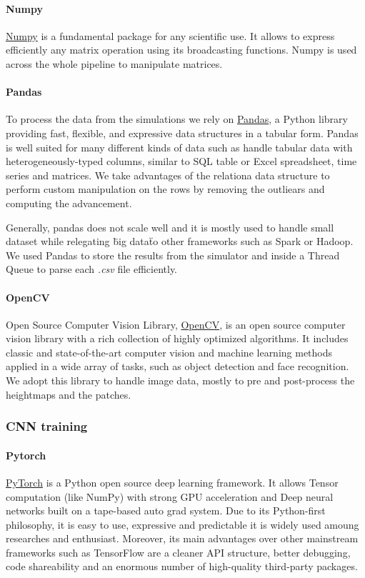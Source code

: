 \documentclass[../document.tex]{subfiles}
\begin{document}
\paragraph{Numpy}\href{https://www.numpy.org/}{Numpy} is a fundamental package for any scientific use. It allows to express efficiently any matrix operation using its broadcasting functions. Numpy is used across the whole pipeline to manipulate matrices.
\paragraph{Pandas}To process the data from the simulations we rely on \href{https://pandas.pydata.org/}{Pandas}, a Python library providing fast, flexible, and expressive data structures in a tabular form. Pandas is well suited for many different kinds of data such as handle tabular data with heterogeneously-typed columns, similar to SQL table or Excel spreadsheet, time series and matrices. We take advantages of the relationa data structure to perform custom manipulation on the rows by removing the outliears and computing the advancement.

Generally, pandas does not scale well and it is mostly used to handle small dataset while relegating \"big data\" to other frameworks such as Spark or Hadoop. We used Pandas to store the results from the simulator and inside a Thread Queue to parse each \emph{.csv} file efficiently.
\paragraph{OpenCV} Open Source Computer Vision Library, \href{https://opencv.org/}{OpenCV}, is an open source computer vision library with a rich collection of highly optimized algorithms. It includes classic and state-of-the-art computer vision and machine learning methods applied in a wide array of tasks, such as object detection and face recognition. We adopt this library to handle image data, mostly to pre and post-process the heightmaps and the patches.
\subsubsection{CNN training}
\paragraph{Pytorch }\href{https://pytorch.org/}{PyTorch} is a Python open source deep learning framework. It allows Tensor computation (like NumPy) with strong GPU acceleration and Deep neural networks built on a tape-based auto grad system. Due to its Python-first philosophy, it is easy to use, expressive and predictable it is widely used amoung researches and enthusiast. Moreover, its main advantages over other mainstream frameworks such as TensorFlow \cite{tensorflow} are a cleaner API structure, better debugging, code shareability and an enormous number of high-quality third-party packages.
\end{document}
